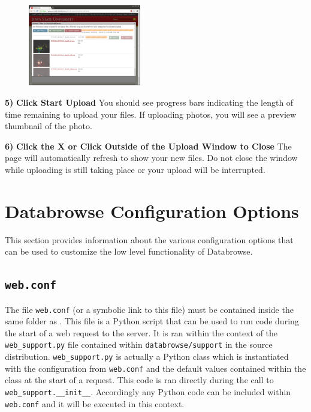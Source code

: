 \documentclass[10pt]{article}
\begin{document}
\endgroup

\hfill \break

\begingroup
\setlength\intextsep{0pt}
\begin{figure}
		\includegraphics[width=1.9339in]{Upload2.png}
\end{figure}
\noindent\textbf{5)} \textbf{Click Start Upload} \newline You should see progress bars indicating the length of time remaining to upload your files.  If uploading photos, you will see a preview thumbnail of the photo. 

\endgroup

\hfill \break
\hfill \break
\hfill \break
\hfill \break

\begin{changemargin}{0in}{150.4pt}
\noindent\textbf{6)} \textbf{Click the X or Click Outside of the Upload Window to Close} \newline The page will automatically refresh to show your new files.  Do not close the window while uploading is still taking place or your upload will be interrupted.
\end{changemargin}


\clearpage
\section{Databrowse Configuration Options}

This section provides information about the various configuration options that can be used to customize the low level functionality of Databrowse.

\subsection{\texttt{web.conf}}

The file \texttt{web.conf} (or a symbolic link to this file) must be contained inside the same folder as .  This file is a Python script that can be used to run code during the start of a web request to the server.  It is ran within the context of the \texttt{web\_support.py} file contained within \texttt{databrowse/support} in the source distribution.  \texttt{web\_support.py} is actually a Python class which is instantiated with the configuration from \texttt{web.conf} and the default values contained within the class at the start of a request.  This code is ran directly during the call to \texttt{web\_support.\_\_init\_\_}.  Accordingly any Python code can be included within \texttt{web.conf} and it will be executed in this context.
\end{document}

